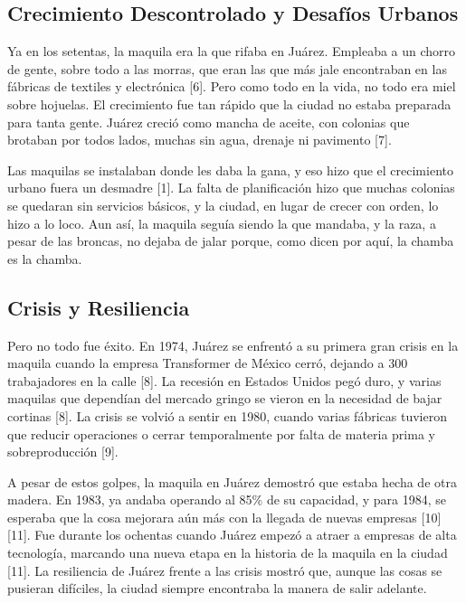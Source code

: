 \documentclass[
  10pt,
  letterpaper,
]{book}
\begin{document}
\subsection{Crecimiento Descontrolado y Desafíos
Urbanos}\label{crecimiento-descontrolado-y-desafuxedos-urbanos}

Ya en los setentas, la maquila era la que rifaba en Juárez. Empleaba a
un chorro de gente, sobre todo a las morras, que eran las que más jale
encontraban en las fábricas de textiles y electrónica {[}6{]}. Pero como
todo en la vida, no todo era miel sobre hojuelas. El crecimiento fue tan
rápido que la ciudad no estaba preparada para tanta gente. Juárez creció
como mancha de aceite, con colonias que brotaban por todos lados, muchas
sin agua, drenaje ni pavimento {[}7{]}.

Las maquilas se instalaban donde les daba la gana, y eso hizo que el
crecimiento urbano fuera un desmadre {[}1{]}. La falta de planificación
hizo que muchas colonias se quedaran sin servicios básicos, y la ciudad,
en lugar de crecer con orden, lo hizo a lo loco. Aun así, la maquila
seguía siendo la que mandaba, y la raza, a pesar de las broncas, no
dejaba de jalar porque, como dicen por aquí, la chamba es la chamba.

\subsection{Crisis y Resiliencia}\label{crisis-y-resiliencia}

Pero no todo fue éxito. En 1974, Juárez se enfrentó a su primera gran
crisis en la maquila cuando la empresa Transformer de México cerró,
dejando a 300 trabajadores en la calle {[}8{]}. La recesión en Estados
Unidos pegó duro, y varias maquilas que dependían del mercado gringo se
vieron en la necesidad de bajar cortinas {[}8{]}. La crisis se volvió a
sentir en 1980, cuando varias fábricas tuvieron que reducir operaciones
o cerrar temporalmente por falta de materia prima y sobreproducción
{[}9{]}.

A pesar de estos golpes, la maquila en Juárez demostró que estaba hecha
de otra madera. En 1983, ya andaba operando al 85\% de su capacidad, y
para 1984, se esperaba que la cosa mejorara aún más con la llegada de
nuevas empresas {[}10{]}{[}11{]}. Fue durante los ochentas cuando Juárez
empezó a atraer a empresas de alta tecnología, marcando una nueva etapa
en la historia de la maquila en la ciudad {[}11{]}. La resiliencia de
Juárez frente a las crisis mostró que, aunque las cosas se pusieran
difíciles, la ciudad siempre encontraba la manera de salir adelante.
\end{document}
